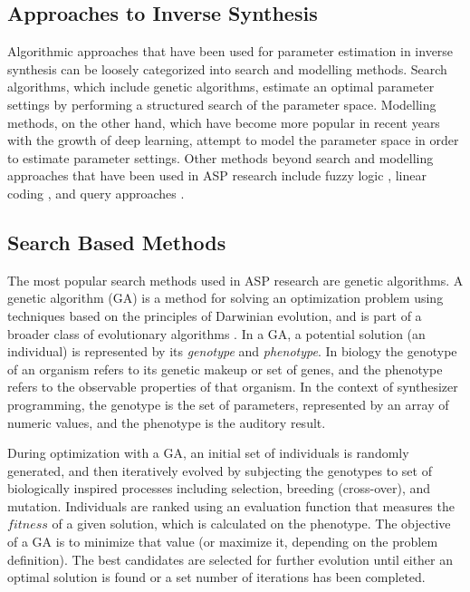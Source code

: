 
\subsection{Approaches to Inverse Synthesis}
Algorithmic approaches that have been used for parameter estimation in inverse synthesis can be loosely categorized into search and modelling methods. Search algorithms, which include genetic algorithms, estimate an optimal parameter settings by performing a structured search of the parameter space. Modelling methods, on the other hand, which have become more popular in recent years with the growth of deep learning, attempt to model the parameter space in order to estimate parameter settings. Other methods beyond search and modelling approaches that have been used in ASP research include fuzzy logic \cite{mitchell2005frequency, hamadicharef2012intelligent}, linear coding \cite{mintz2007toward}, and query approaches \cite{mcartwright2014}.

\subsection{Search Based Methods}
The most popular search methods used in ASP research are genetic algorithms. A genetic algorithm (GA) is a method for solving an optimization problem using techniques based on the principles of Darwinian evolution, and is part of a broader class of evolutionary algorithms \cite{whitley1994genetic}. In a GA, a potential solution (an individual) is represented by its \textit{genotype} and \textit{phenotype}. In biology the genotype of an organism refers to its genetic makeup or set of genes, and the phenotype refers to the observable properties of that organism. In the context of synthesizer programming, the genotype is the set of parameters, represented by an array of numeric values, and the phenotype is the auditory result. 

During optimization with a GA, an initial set of individuals is randomly generated, and then iteratively evolved by subjecting the genotypes to set of biologically inspired processes including selection, breeding (cross-over), and mutation. Individuals are ranked using an evaluation function that measures the $fitness$ of a given solution, which is calculated on the phenotype. The objective of a GA is to minimize that value (or maximize it, depending on the problem definition). The best candidates are selected for further evolution until either an optimal solution is found or a set number of iterations has been completed.

